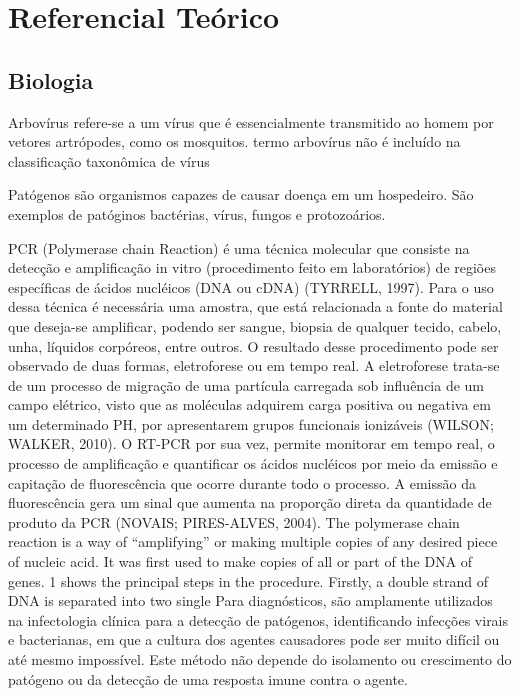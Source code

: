 \chapter{Referencial Teórico}
\section{Biologia}

Arbovírus refere-se a um vírus que é essencialmente transmitido ao homem por vetores artrópodes, como os mosquitos.
termo arbovírus não é incluído na classificação taxonômica de vírus

Patógenos são organismos capazes de causar doença em um hospedeiro. São exemplos de patóginos bactérias, vírus, fungos e protozoários.

PCR (Polymerase chain Reaction) é uma técnica molecular que consiste na detecção e amplificação in vitro (procedimento feito em laboratórios) de regiões específicas de ácidos nucléicos (DNA ou cDNA) (TYRRELL, 1997). Para o uso dessa técnica é necessária uma amostra, que está relacionada a fonte do material que deseja-se amplificar, podendo ser sangue, biopsia de qualquer tecido, cabelo, unha, líquidos corpóreos, entre outros. O resultado desse procedimento pode ser observado de duas formas, eletroforese ou em tempo real. A eletroforese trata-se de um processo de migração de uma partícula carregada sob influência de um campo elétrico, visto que as moléculas adquirem carga positiva ou negativa em um determinado PH, por apresentarem grupos funcionais ionizáveis (WILSON; WALKER, 2010).
O RT-PCR por sua vez, permite monitorar em tempo real, o processo de amplificação e quantificar os ácidos nucléicos por meio da emissão e capitação de fluorescência que ocorre durante todo o processo.
A emissão da fluorescência gera um sinal que aumenta na proporção direta da quantidade de produto da PCR (NOVAIS; PIRES-ALVES, 2004).
The polymerase chain reaction is a way of “amplifying” or making multiple copies of any desired piece of nucleic acid. It was first used to make copies of all or part of the DNA of genes. 1 shows the principal steps in the procedure. Firstly, a double strand of DNA is separated into two single 
Para diagnósticos, são amplamente utilizados na infectologia clínica para a detecção de patógenos, identificando infecções virais e bacterianas, em que a cultura dos agentes causadores pode ser muito difícil ou até mesmo impossível. Este método não depende do isolamento ou crescimento do patógeno ou da detecção de uma resposta imune contra o agente.

